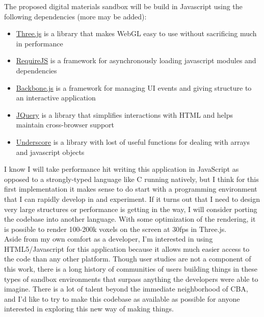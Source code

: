 {The proposed digital materials sandbox will be build in Javascript using the following dependencies (more may be added):
\begin{itemize}
\setlength\itemsep{0em}
\item \href{http://threejs.org/}{Three.js} is a library that makes WebGL easy to use without sacrificing much in performance
\item \href{http://requirejs.org/}{RequireJS} is a framework for asynchronously loading javascript modules and dependencies
\item \href{http://backbonejs.org/}{Backbone.js} is a framework for managing UI events and giving structure to an interactive application
\item \href{https://jquery.com/}{JQuery} is a library that simplifies interactions with HTML and helps maintain cross-browser support
\item \href{http://underscorejs.org/}{Underscore} is a library with lost of useful functions for dealing with arrays and javascript objects
\end{itemize}

I know I will take  performance hit writing this application in JavaScript as opposed to a strongly-typed language like C running natively, but I think for this first implementation it makes sense to do start with a programming environment that I can rapidly develop in and experiment.  If it turns out that I need to design very large structures or performance is getting in the way, I will consider porting the codebase into another language.  With some optimization of the rendering, it is possible to render 100-200k voxels on the screen at 30fps in Three.js.  
\\

Aside from my own comfort as a developer, I'm interested in using HTML5/Javascript for this application because it allows much easier access to the code than any other platform.  Though user studies are not a component of this work, there is a long history of communities of users building things in these types of sandbox environments that surpass anything the developers were able to imagine.  There is a lot of talent beyond the immediate neighborhood of CBA, and I'd like to try to make this codebase as available as possible for anyone interested in exploring this new way of making things.

%
%
%

}
